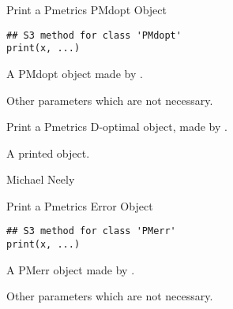 \documentclass[a4paper]{book}
\begin{document}
%
\begin{SeeAlso}\relax
{}
\end{SeeAlso}
%
\begin{Description}\relax
Print a Pmetrics PMdopt Object
\end{Description}
%
\begin{Usage}
\begin{verbatim}
## S3 method for class 'PMdopt'
print(x, ...)
\end{verbatim}
\end{Usage}
%
\begin{Arguments}
\begin{ldescription}
\item[\code{x}] A PMdopt object made by .

\item[\code{...}] Other parameters which are not necessary.
\end{ldescription}
\end{Arguments}
%
\begin{Details}\relax
Print a Pmetrics D-optimal object, made by .
\end{Details}
%
\begin{Value}
A printed object.
\end{Value}
%
\begin{Author}\relax
Michael Neely
\end{Author}
%
\begin{SeeAlso}\relax
{}
\end{SeeAlso}
%
\begin{Description}\relax
Print a Pmetrics Error Object
\end{Description}
%
\begin{Usage}
\begin{verbatim}
## S3 method for class 'PMerr'
print(x, ...)
\end{verbatim}
\end{Usage}
%
\begin{Arguments}
\begin{ldescription}
\item[\code{x}] A PMerr object made by .

\item[\code{...}] Other parameters which are not necessary.
\end{ldescription}
\end{Arguments}
\end{document}
